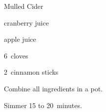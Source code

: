 \begin{recipe}{Mulled Cider\FIXME}{}{}

\begin{ingredients}
\item {} cranberry juice
\item {} apple juice
\item 6~cloves
\item 2~cinnamon sticks
\end{ingredients}

\begin{directions}
\item Combine all ingredients in a pot.
\item Simmer 15 to 20~minutes.
\end{directions}

\end{recipe}
